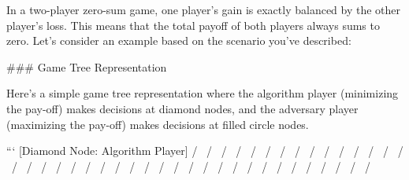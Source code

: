 In a two-player zero-sum game, one player's gain is exactly balanced by the other player's loss. This means that the total payoff of both players always sums to zero. Let's consider an example based on the scenario you've described:

### Game Tree Representation

Here’s a simple game tree representation where the algorithm player (minimizing the pay-off) makes decisions at diamond nodes, and the adversary player (maximizing the pay-off) makes decisions at filled circle nodes.

```
          [Diamond Node: Algorithm Player]
            /       \
           /         \
          /           \
         /             \
        /               \
       /                 \
      /                   \
     /                     \
    /                       \
   /                         \
  /                           \
 /                             \
/                               \
/                                 \
/                                   \
/                                     \
/                                       \
/                                         \
/                                           \
/                                             \
/                                               \
/                                                 \
/                                                   \
/                                                     \
/                                                       \
/                                                         \
/                                                           \
/                                                             \
/                                                               \
/                                                                 \
/                                                                   \
/                                                                     \
/                                                                       \
/                                                                         \
/                                                                           \
/                                                                             \
/                                                                               \
/                                                                                 \
/                                                                                   \
/                                                                                   \
